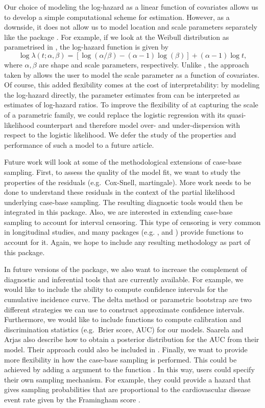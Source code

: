 \documentclass[
]{jss}
\begin{document}
Our choice of modeling the log-hazard as a linear function of covariates
allows us to develop a simple computational scheme for estimation.
However, as a downside, it does not allow us to model location and scale
parameters separately like the package . For example, if
we look at the Weibull distribution as parametrised in
, the log-hazard function is given by
\[ \log \lambda(t; \alpha, \beta) = \left[\log(\alpha/\beta) - (\alpha - 1)\log(\beta)\right] + (\alpha - 1)\log t,\]
where \(\alpha,\beta\) are shape and scale parameters, respectively.
Unlike , the approach taken by  allows the
user to model the scale parameter as a function of covariates. Of
course, this added flexibility comes at the cost of interpretability: by
modeling the log-hazard directly, the parameter estimates from
 can be interpreted as estimates of log-hazard ratios. To
improve the flexibility of  at capturing the scale of a
parametric family, we could replace the logistic regression with its
quasi-likelihood counterpart and therefore model over- and
under-dispersion with respect to the logistic likelihood. We defer the
study of the properties and performance of such a model to a future
article.

Future work will look at some of the methodological extensions of
case-base sampling. First, to assess the quality of the model fit, we
want to study the properties of the residuals (e.g.~Cox-Snell,
martingale). More work needs to be done to understand these residuals in
the context of the partial likelihood underlying case-base sampling. The
resulting diagnostic tools would then be integrated in this package.
Also, we are interested in extending case-base sampling to account for
interval censoring. This type of censoring is very common in
longitudinal studies, and many packages (e.g. ,
 and ) provide functions to account for it.
Again, we hope to include any resulting methodology as part of this
package.

In future versions of the package, we also want to increase the
complement of diagnostic and inferential tools that are currently
available. For example, we would like to include the ability to compute
confidence intervals for the cumulative incidence curve. The delta
method or parametric bootstrap are two different strategies we can use
to construct approximate confidence intervals. Furthermore, we would
like to include functions to compute calibration and discrimination
statistics (e.g.~Brier score, AUC) for our models. Saarela and Arjas
\citeyearpar{saarela2015non} also describe how to obtain a posterior
distribution for the AUC from their model. Their approach could also be
included in . Finally, we want to provide more flexibility
in how the case-base sampling is performed. This could be achieved by
adding a  argument to the function .
In this way, users could specify their own sampling mechanism. For
example, they could provide a hazard that gives sampling probabilities
that are proportional to the cardiovascular disease event rate given by
the Framingham score \citep{saarela2015non}.
\end{document}

